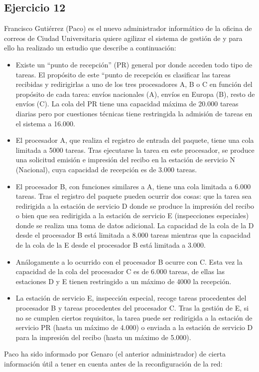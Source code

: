 \subsection{Ejercicio 12}

Francisco  Gutiérrez  (Paco)  es  el  nuevo  administrador  informático  de  la  oficina  de  correos  de  Ciudad Universitaria quiere  agilizar el sistema de  gestión de  y para ello ha realizado un estudio que  describe  a continuación:

\begin{itemize}
    \item Existe  un \enquote{punto  de  recepción}  (PR)  general por  donde  acceden todo  tipo  de  tareas.  El  propósito  de este “punto de recepción es clasificar las tareas recibidas y redirigirlas a uno de los tres procesadores A, B o C en función del propósito de cada tarea: envíos nacionales (A), envíos en Europa (B), resto de envíos (C). La  cola  del  PR tiene  una  capacidad  máxima  de  20.000  tareas diarias pero por  cuestiones  técnicas tiene restringida la admisión de tareas en el sistema a 16.000.
    \item El procesador A, que realiza el registro de entrada del paquete, tiene una cola limitada a 5000 tareas. Tras ejecutarse la tarea en este procesador, se produce una solicitud emisión e impresión del recibo en la estación de servicio N (Nacional), cuya capacidad de recepción es de 3.000 tareas.
    \item El procesador B, con funciones similares a A, tiene una cola limitada a 6.000 tareas. Tras el registro del paquete pueden  ocurrir  dos  cosas:  que  la tarea  sea  redirigida  a  la  estación  de  servicio D  donde  se produce  la  impresión  del  recibo o  bien  que  sea  redirigida  a  la  estación  de  servicio E  (inspecciones especiales) donde  se realiza  una  toma  de  datos  adicional.  La capacidad  de  la  cola  de  la D desde  el procesador  B  está  limitada  a  8.000  tareas  mientras  que  la  capacidad de  la  cola  de  la E desde  el procesador B está limitada a 3.000.
    \item Análogamente  a  lo  ocurrido  con  el  procesador  B  ocurre  con  C.  Esta  vez  la  capacidad  de  la  cola  del procesador C es de 6.000 tareas, de ellas las estaciones D y E tienen restringido a un máximo de 4000 la recepción.
    \item La  estación  de  servicio E, inspección  especial,  recoge  tareas  procedentes  del  procesador  B  y  tareas procedentes  del  procesador  C. Tras  la  gestión  de  E, si  no  se  cumplen  ciertos  requisitos,  la tarea  puede ser redirigida a la estación de servicio PR (hasta un máximo de 4.000) o enviada a la estación de servicio D para la impresión del recibo (hasta un máximo de 5.000).
\end{itemize}
Paco ha  sido  informado por  Genaro  (el  anterior  administrador) de cierta  información  útil a tener  en cuenta antes de la reconfiguración de la red:

